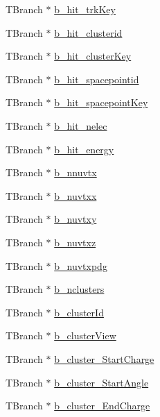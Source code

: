 \begin{DoxyCompactItemize}
\item 
T\-Branch $\ast$ \hyperlink{classanatree_abeccc186a488a6a3be9d89014880bed5}{b\-\_\-hit\-\_\-trk\-Key}
\item 
T\-Branch $\ast$ \hyperlink{classanatree_ab7e18b3b259e1b6dddc3b9e6f10cdcb6}{b\-\_\-hit\-\_\-clusterid}
\item 
T\-Branch $\ast$ \hyperlink{classanatree_aa83f1bd44f10c67dff08e254d255bac4}{b\-\_\-hit\-\_\-cluster\-Key}
\item 
T\-Branch $\ast$ \hyperlink{classanatree_a960d5b84d2f29c6d5fa6b28ed980ebc2}{b\-\_\-hit\-\_\-spacepointid}
\item 
T\-Branch $\ast$ \hyperlink{classanatree_a0684dae14dd98c6c10518c448048f845}{b\-\_\-hit\-\_\-spacepoint\-Key}
\item 
T\-Branch $\ast$ \hyperlink{classanatree_af7b96e2e3ba75f7e5d1d69b4dfb7048f}{b\-\_\-hit\-\_\-nelec}
\item 
T\-Branch $\ast$ \hyperlink{classanatree_ae8a1cf81ba11ba4c779800839f7dcf5c}{b\-\_\-hit\-\_\-energy}
\item 
T\-Branch $\ast$ \hyperlink{classanatree_a452b5ba4ae1b3aaf396bbe61ca11ec52}{b\-\_\-nnuvtx}
\item 
T\-Branch $\ast$ \hyperlink{classanatree_a126a9f6b5eb9a1ffab01f9799e6a296b}{b\-\_\-nuvtxx}
\item 
T\-Branch $\ast$ \hyperlink{classanatree_a2f1d435275d1d41445d733fa73b20df2}{b\-\_\-nuvtxy}
\item 
T\-Branch $\ast$ \hyperlink{classanatree_a1e8cb73d7589c82d63e16e04715756dd}{b\-\_\-nuvtxz}
\item 
T\-Branch $\ast$ \hyperlink{classanatree_af307a3e20680931598a7b6c3d90c9b0c}{b\-\_\-nuvtxpdg}
\item 
T\-Branch $\ast$ \hyperlink{classanatree_af1083b6389ce80b46873d5452c08ad66}{b\-\_\-nclusters}
\item 
T\-Branch $\ast$ \hyperlink{classanatree_ab8f7649098e53db2cae4786cd614215c}{b\-\_\-cluster\-Id}
\item 
T\-Branch $\ast$ \hyperlink{classanatree_a3dd99c1458502b95769e28e970ac4358}{b\-\_\-cluster\-View}
\item 
T\-Branch $\ast$ \hyperlink{classanatree_a6e674f8fed09644c85d76b31163ea638}{b\-\_\-cluster\-\_\-\-Start\-Charge}
\item 
T\-Branch $\ast$ \hyperlink{classanatree_a72c8b71bbd6fc4e96da67640c94f51e1}{b\-\_\-cluster\-\_\-\-Start\-Angle}
\item 
T\-Branch $\ast$ \hyperlink{classanatree_a5540328dd89b297a67f4c354e8abc598}{b\-\_\-cluster\-\_\-\-End\-Charge}

\end{DoxyCompactItemize}

